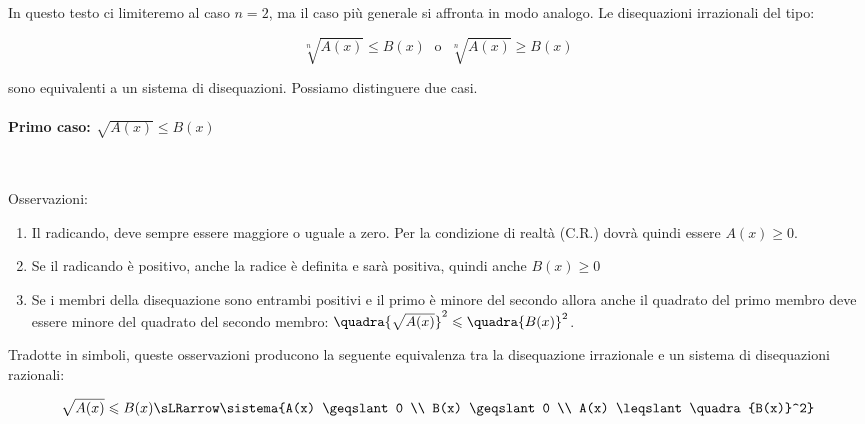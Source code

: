 In questo testo ci limiteremo al caso \(n=2\), ma il caso più 
generale si affronta in modo analogo. Le disequazioni irrazionali del tipo:

\[\sqrt[n]{A(x)} \leqslant B(x) \;\text{ o }\; \sqrt[n]{A(x)} \geqslant B(x)\]

sono equivalenti a un sistema di disequazioni. Possiamo 
distinguere due casi.

\paragraph{Primo caso: \(\sqrt{A(x)} \leqslant B(x)\)}
~

Osservazioni: 
\begin{enumerate} 
 \item Il radicando, deve sempre essere maggiore o uguale a zero. 
Per la condizione di realtà (C.R.) dovrà quindi essere \({A(x)} \geqslant 0\).
 \item Se il radicando è positivo, anche la radice è definita e sarà 
positiva, quindi anche \({B(x)} \geqslant 0\)
 \item Se i membri della disequazione sono entrambi positivi e il primo è 
minore 
del secondo allora anche il quadrato del primo membro deve essere minore del 
quadrato del secondo membro: 
\(\quadra{\sqrt{A(x)}}^2 \leqslant \quadra{B(x)}^2\).
\end{enumerate}

Tradotte in simboli, queste osservazioni producono la seguente equivalenza tra 
la disequazione irrazionale e un sistema di disequazioni razionali:

\[\sqrt{A(x)} \leqslant B(x) \sLRarrow 
  \sistema{A(x) \geqslant 0 \\ 
           B(x) \geqslant 0 \\ 
           A(x) \leqslant \quadra{B(x)}^2}\]


